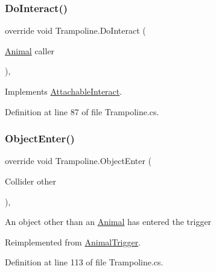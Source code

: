 \subsubsection{\texorpdfstring{Do\+Interact()}{DoInteract()}}
{\footnotesize\ttfamily override void Trampoline.\+Do\+Interact (\begin{DoxyParamCaption}\item[{\mbox{\hyperlink{class_animal}{Animal}}}]{caller }\end{DoxyParamCaption})\hspace{0.3cm}{\ttfamily [protected]}, {\ttfamily [virtual]}}



Implements \mbox{\hyperlink{class_attachable_interact_a9b07a54f1dbb96777c4bd287dfe438e3}{Attachable\+Interact}}.



Definition at line 87 of file Trampoline.\+cs.

\mbox{\label{class_trampoline_a82a3dc5c89e349b31def18b36ee1ad5a}} 
\subsubsection{\texorpdfstring{Object\+Enter()}{ObjectEnter()}}
{\footnotesize\ttfamily override void Trampoline.\+Object\+Enter (\begin{DoxyParamCaption}\item[{Collider}]{other }\end{DoxyParamCaption})\hspace{0.3cm}{\ttfamily [protected]}, {\ttfamily [virtual]}}



An object other than an \mbox{\hyperlink{class_animal}{Animal}} has entered the trigger 



Reimplemented from \mbox{\hyperlink{class_animal_trigger_ac9d6fbc38448a5369e5658ae0774bd58}{Animal\+Trigger}}.



Definition at line 113 of file Trampoline.\+cs.

\mbox{\label{class_trampoline_a3924d1f315181a81e2117ab239b8ec0e}} 
